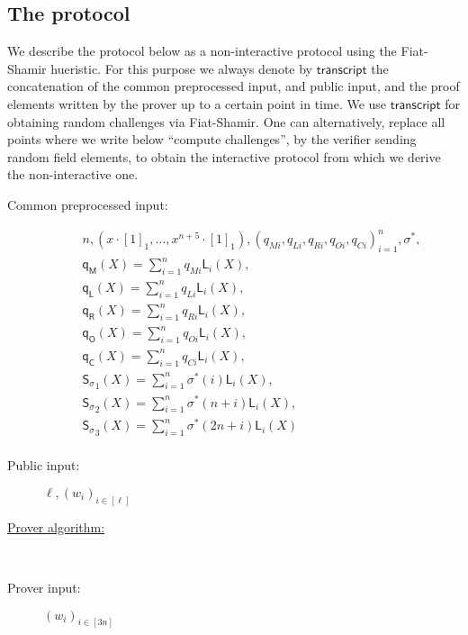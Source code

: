 \documentclass[11pt]{article} %
\newcommand{\vecc}[2]{\ensuremath{(#1)_{#2}}\xspace}
\newcommand{\sigpoly}{\ensuremath{\mathsf{S_{\sigma}}}\xspace}
\newcommand{\lagrangepoly}{\ensuremath{\mathsf{L}}\xspace}
\newcommand{\selmultpoly}{\ensuremath{\mathsf{q_M}}\xspace}
\newcommand{\selleftpoly}{\ensuremath{\mathsf{q_L}}\xspace}
\newcommand{\selrightpoly}{\ensuremath{\mathsf{q_R}}\xspace}
\newcommand{\seloutpoly}{\ensuremath{\mathsf{q_O}}\xspace}
\newcommand{\selconstpoly}{\ensuremath{\mathsf{q_C}}\xspace}
\newcommand{\transcript}{\ensuremath{\mathsf{transcript}}\xspace}
\begin{document}
\subsection{The protocol}

We describe the protocol below as a non-interactive protocol using the Fiat-Shamir hueristic.
For this purpose we always denote by \transcript the concatenation of the common preprocessed input, and public input, and the proof elements written by the prover up to a certain point in time.
We use \transcript for obtaining random challenges via Fiat-Shamir. One can alternatively, replace all points where we write below ``compute challenges'', by the verifier sending random field elements, to obtain the interactive protocol from which we derive the non-interactive one.  
\begin{description}
	\item[Common preprocessed input:]
	$$\begin{array}{l}n, (x \cdot [1]_1, \ldots, {x^{n+5}} \cdot [1]_1), (q_{Mi}, q_{Li}, q_{Ri}, q_{Oi}, q_{Ci})_{i=1}^n, \sigma^*, \\
	\selmultpoly(X) = \sum_{i=1}^nq_{Mi}\lagrangepoly_i(X), \\
	\selleftpoly(X) = \sum_{i=1}^nq_{Li}\lagrangepoly_i(X), \\
	\selrightpoly(X) = \sum_{i=1}^nq_{Ri}\lagrangepoly_i(X), \\ \seloutpoly(X) = \sum_{i=1}^nq_{Oi}\lagrangepoly_i(X), \\ \selconstpoly(X) = \sum_{i=1}^nq_{Ci}\lagrangepoly_i(X), \\
	\sigpoly_1(X) = \sum_{i=1}^n \sigma^*(i) \lagrangepoly_i(X), \\ \sigpoly_2(X) = \sum_{i=1}^n \sigma^*(n + i) \lagrangepoly_i(X), \\ \sigpoly_3(X) = \sum_{i=1}^n \sigma^*(2n + i) \lagrangepoly_i(X)\\ \
\end{array}$$
	\item[Public input:] 	$\ell, \vecc{w_i}{i\in [\ell]}$
	\item[\underline{Prover algorithm:}] \ \\
	\item[Prover input:] $\vecc{w_i}{i\in [3n]}$
	
	\end{description}
	
	
	\noindent
\end{document}
